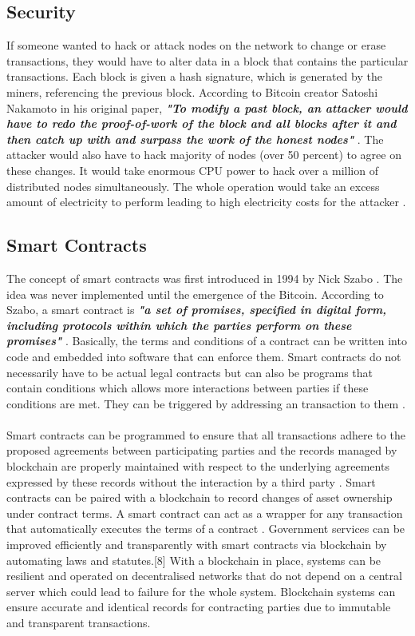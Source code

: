 \documentclass[report]{IEEEtran}
\begin{document}
 \subsection{Security}
 If someone wanted to hack or attack nodes on the network to change or erase transactions, they would have to alter data in a block that contains the particular transactions. Each block is given a hash signature, which is generated by the miners, referencing the previous block. According to Bitcoin creator Satoshi Nakamoto in his original paper, \textbf{\textit{"To modify a past block, an attacker would have to redo the proof-of-work of the block and all blocks after it and then catch up with and surpass the work of the honest nodes"}} \cite{bitcoin}. The attacker would also have to hack majority of nodes (over 50 percent) to agree on these changes. It would take enormous CPU power to hack over a million of distributed nodes simultaneously. The whole operation would take an excess amount of electricity to perform leading to high electricity costs for the attacker \cite{smartcon}.
 
 \subsection{Smart Contracts}
 The concept of smart contracts was first introduced in 1994 by Nick Szabo \cite{szabo}. The idea was never implemented until the emergence of the Bitcoin. According to Szabo, a smart contract is \textbf{\textit{"a set of promises, specified in digital form, including protocols within which the parties perform on these promises"}} \cite{szabo}. Basically, the terms and conditions of a contract can be written into code and embedded into software that can enforce them. Smart contracts do not necessarily have to be actual legal contracts but can also be programs that contain conditions which allows more interactions between parties if these conditions are met. They can be triggered by addressing an transaction to them \cite{smartcon}.
 \\\\ Smart contracts can be programmed to ensure that all transactions adhere to the proposed agreements between participating parties and the records managed by blockchain are properly maintained with respect to the underlying agreements expressed by these records without the interaction by a third party \cite{double}. Smart contracts can be paired with a blockchain to record changes of asset ownership under contract terms. A smart contract can act as a wrapper for any transaction that automatically executes the terms of a contract \cite{finance}. Government services can be improved efficiently and transparently with smart contracts via blockchain by automating laws and statutes.[8] With a blockchain in place, systems can be resilient and operated on decentralised networks that do not depend on a central server which could lead to failure for the whole system. Blockchain systems can ensure accurate and identical records for contracting parties due to immutable and transparent transactions. 
\end{document}
